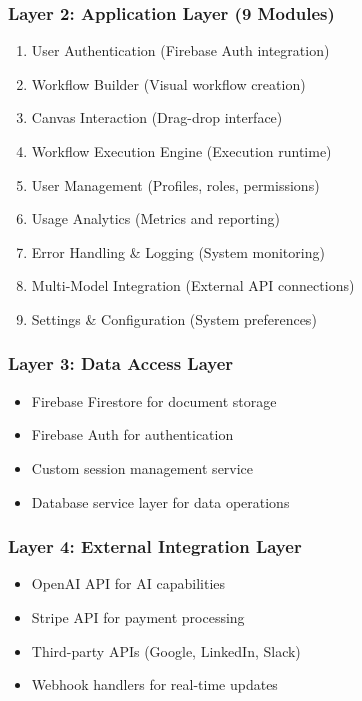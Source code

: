 \documentclass[12pt,a4paper]{article}
\begin{document}
\subsubsection{Layer 2: Application Layer (9 Modules)}
\begin{enumerate}
    \item User Authentication (Firebase Auth integration)
    \item Workflow Builder (Visual workflow creation)
    \item Canvas Interaction (Drag-drop interface)
    \item Workflow Execution Engine (Execution runtime)
    \item User Management (Profiles, roles, permissions)
    \item Usage Analytics (Metrics and reporting)
    \item Error Handling \& Logging (System monitoring)
    \item Multi-Model Integration (External API connections)
    \item Settings \& Configuration (System preferences)
\end{enumerate}

\subsubsection{Layer 3: Data Access Layer}
\begin{itemize}
    \item Firebase Firestore for document storage
    \item Firebase Auth for authentication
    \item Custom session management service
    \item Database service layer for data operations
\end{itemize}

\subsubsection{Layer 4: External Integration Layer}
\begin{itemize}
    \item OpenAI API for AI capabilities
    \item Stripe API for payment processing
    \item Third-party APIs (Google, LinkedIn, Slack)
    \item Webhook handlers for real-time updates
\end{itemize}
\end{document}
